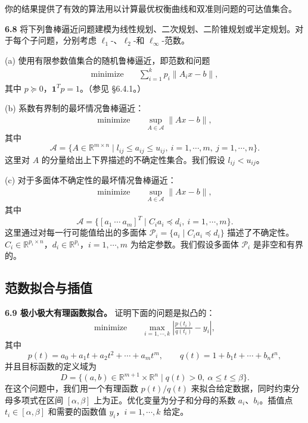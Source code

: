 \documentclass[UTF8, 12pt, fontset=fandol, oneside]{ctexart}
\begin{document}
你的结果提供了有效的算法用以计算最优权衡曲线和双准则问题的可达值集合。

\noindent\textbf{6.8}\quad
将下列鲁棒逼近问题建模为线性规划、二次规划、二阶锥规划或半定规划。对于每个子问题，分别考虑 $\ell_1$-、$\ell_2$-和 $\ell_\infty$-范数。

(a) 使用有限参数值集合的随机鲁棒逼近，即范数和问题
\[
\begin{aligned}
\text{minimize}\quad & \sum_{i=1}^k p_i\|A_ix-b\|,
\end{aligned}
\]
其中 $p\succeq 0$，$\mathbf{1}^Tp=1$。（参见 \S6.4.1。）

(b) 系数有界制的最坏情况鲁棒逼近：
\[
\begin{aligned}
\text{minimize}\quad & \sup_{A\in\mathcal{A}}\|Ax-b\|,
\end{aligned}
\]
其中
\[
\mathcal{A}=\{A\in\mathbb{R}^{m\times n}\mid l_{ij}\leq a_{ij}\leq u_{ij},\ i=1,\cdots,m,\ j=1,\cdots,n\}.
\]
这里对 $A$ 的分量给出上下界描述的不确定性集合。我们假设 $l_{ij}<u_{ij}$。

(c) 对于多面体不确定性的最坏情况鲁棒逼近：
\[
\begin{aligned}
\text{minimize}\quad & \sup_{A\in\mathcal{A}}\|Ax-b\|,
\end{aligned}
\]
其中
\[
\mathcal{A}=\{[a_1\ \cdots\ a_m]^T\mid C_i a_i\preceq d_i,\ i=1,\cdots,m\}.
\]
这里通过对每一行可能值给出的多面体 $\mathcal{P}_i=\{a_i\mid C_i a_i\preceq d_i\}$ 描述了不确定性。$C_i\in\mathbb{R}^{p_i\times n}$，$d_i\in\mathbb{R}^{p_i}$，$i=1,\cdots,m$ 为给定参数。我们假设多面体 $\mathcal{P}_i$ 是非空和有界的。

\subsection*{范数拟合与插值}

\noindent\textbf{6.9 极小极大有理函数拟合。}\quad
证明下面的问题是拟凸的：
\[
\begin{aligned}
\text{minimize}\quad & \max_{i=1,\cdots,k}\left|\frac{p(t_i)}{q(t_i)}-y_i\right|,
\end{aligned}
\]
其中
\[
p(t)=a_0+a_1t+a_2t^2+\cdots+a_mt^m,\qquad
q(t)=1+b_1t+\cdots+b_nt^n,
\]
并且目标函数的定义域为
\[
D=\{(a,b)\in\mathbb{R}^{m+1}\times\mathbb{R}^n\mid q(t)>0,\ \alpha\leq t\leq\beta\}.
\]
在这个问题中，我们用一个有理函数 $p(t)/q(t)$ 来拟合给定数据，同时约束分母多项式在区间 $[\alpha,\beta]$ 上为正。优化变量为分子和分母的系数 $a_i$、$b_i$。插值点 $t_i\in[\alpha,\beta]$ 和需要的函数值 $y_i$，$i=1,\cdots,k$ 给定。
\end{document}
